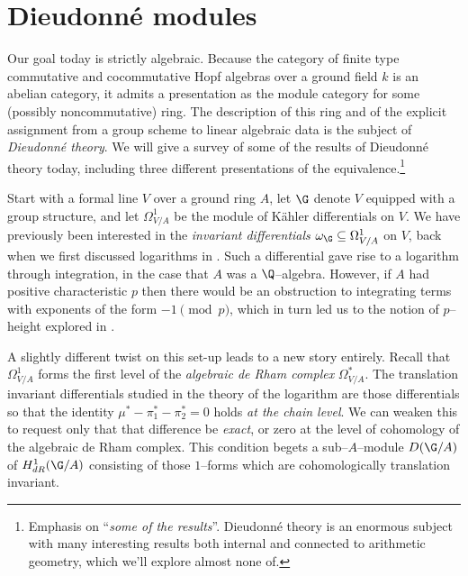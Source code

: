 \section{Dieudonn\'e modules}\label{SectionDieudonneModules}

Our goal today is strictly algebraic.  Because the category of finite type commutative and cocommutative Hopf algebras over a ground field $k$ is an abelian category, it admits a presentation as the module category for some (possibly noncommutative) ring.  The description of this ring and of the explicit assignment from a group scheme to linear algebraic data is the subject of \textit{Dieudonn\'e theory}.  We will give a survey of some of the results of Dieudonn\'e theory today, including three different presentations of the equivalence.\footnote{Emphasis on ``\emph{some of the results}''.  Dieudonn\'e theory is an enormous subject with many interesting results both internal and connected to arithmetic geometry, which we'll explore almost none of.}

Start with a formal line $V$ over a ground ring $A$, let $\G$ denote $V$ equipped with a group structure, and let $\Omega^1_{V/A}$ be the module of K\"ahler differentials on $V$.  We have previously been interested in the \textit{invariant differentials} $\omega_{\G} \subseteq \Omega^1_{V/A}$ on $V$, back when we first discussed logarithms in .  Such a differential gave rise to a logarithm through integration, in the case that $A$ was a $\Q$--algebra.  However, if $A$ had positive characteristic $p$ then there would be an obstruction to integrating terms with exponents of the form $-1 \pmod p$, which in turn led us to the notion of $p$--height explored in .

A slightly different twist on this set-up leads to a new story entirely.  Recall that $\Omega^1_{V/A}$ forms the first level of the \textit{algebraic de Rham complex} $\Omega^*_{V/A}$.  The translation invariant differentials studied in the theory of the logarithm are those differentials so that the identity $\mu^* - \pi_1^* - \pi_2^* = 0$  holds \emph{at the chain level}.  We can weaken this to request only that that difference be \emph{exact}, or zero at the level of cohomology of the algebraic de Rham complex.  This condition begets a sub--$A$--module $D(\G/A)$ of $H^1_{dR}(\G/A)$ consisting of those $1$--forms which are cohomologically translation invariant.

